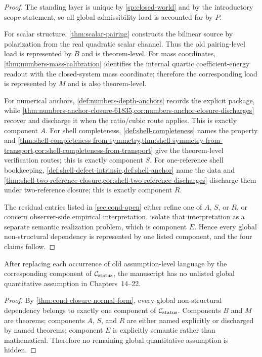 \begin{proof}
The standing layer is unique by \cref{sp:closed-world} and by the
introductory scope statement, so all global admissibility load is accounted
for by \(P\).

For scalar structure, \cref{thm:scalar-pairing} constructs the bilinear source
by polarization from the real quadratic scalar channel.  Thus the old
pairing-level load is represented by \(B\) and is theorem-level.  For mass
coordinates, \cref{thm:numbers-mass-calibration} identifies the internal
quartic coefficient-energy readout with the closed-system mass coordinate;
therefore the corresponding load is represented by \(M\) and is also
theorem-level.

For numerical anchors, \cref{def:numbers-depth-anchors} records the explicit
package, while \cref{thm:numbers-anchor-closure-61835,cor:numbers-anchor-closure-discharges}
recover and discharge it when the ratio/cubic route applies.  This is exactly
component \(A\).  For shell completeness,
\cref{def:shell-completeness} names the property and
\cref{thm:shell-completeness-from-symmetry,thm:shell-symmetry-from-transport,cor:shell-completeness-from-transport}
give the theorem-level verification routes; this is exactly component \(S\).
For one-reference shell bookkeeping,
\cref{def:shell-defect-intrinsic,def:shell-anchor} name the data and
\cref{thm:shell-two-reference-closure,cor:shell-two-reference-discharges}
discharge them under two-reference closure; this is exactly component \(R\).

The residual entries listed in \cref{sec:cond-open} either refine one of
\(A\), \(S\), or \(R\), or concern observer-side empirical interpretation.
isolate that interpretation as a separate semantic realization problem,
which is component \(E\).  Hence every global non-structural dependency is
represented by one listed component, and the four claims follow.
\end{proof}

\begin{corollary}
\label{cor:cond-no-hidden-global-assumptions}
After replacing each occurrence of old assumption-level language by the
corresponding component of \(\mathcal C_{\rm status}\), the manuscript has no
unlisted global quantitative assumption in Chapters~14--22.
\end{corollary}

\begin{proof}
By \cref{thm:cond-closure-normal-form}, every global non-structural dependency
belongs to exactly one component of \(\mathcal C_{\rm status}\).  Components
\(B\) and \(M\) are theorems; components \(A\), \(S\), and \(R\) are either
named explicitly or discharged by named theorems; component \(E\) is explicitly
semantic rather than mathematical.  Therefore no remaining global
quantitative assumption is hidden.
\end{proof}

